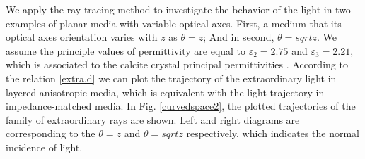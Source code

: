 \documentclass[9pt,twocolumn,twoside]{osajnl}
\begin{document}
We apply the ray-tracing method to investigate the behavior of the light in two examples of planar media with variable optical axes. First, a medium that its optical axes orientation varies with $z$ as $\theta=z$;  And in second, $\theta=sqrt{z}$. We assume the principle values of permittivity are equal to  $\varepsilon_{2}=2.75$ and $\varepsilon_{3}=2.21$, which is associated to the calcite crystal principal permittivities \cite{yariv1984optical}.  According to the relation {\ref{extra.d}} we can plot the trajectory of the extraordinary light in layered anisotropic media, which is equivalent with the light trajectory in impedance-matched media. In Fig. \ref{curvedspace2}, the plotted trajectories of the family of extraordinary rays are shown.  Left and right diagrams are corresponding to the $\theta=z$ and $\theta=sqrt{z}$ respectively, which indicates the normal incidence of light. 
\end{document}
